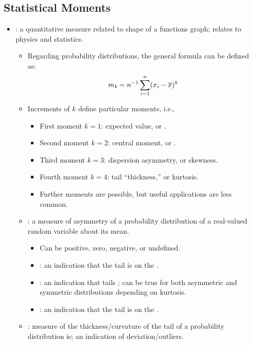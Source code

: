 \begin{itemize}
  \subsection{Statistical Moments}
  \begin{itemize}
    \item {}: a quantitative measure related to shape of a functions graph; relates to physics and statistics.
      \begin{itemize}
        \item Regarding probability distributions, the general formula can be defined as:
        \[%
        m_\emph{k} = n ^{-1} \sum_{i = 1}^{n}(x_i - \overline{x})^\emph{k}
        \]%
        \item Increments of \(k\) define particular moments, i.e.,
          \begin{itemize}
            \item First moment \(k=1\): expected value, or \hyperref[Subsection: Measures of Central Tendency]{}.
            \item Second moment \(k=2\): central moment, or \hyperref[Subsection: Measures of Dispersion]{}.
            \item Third moment \(k=3\): dispersion asymmetry, or skewness.
            \item Fourth moment \(k=4\): tail ``thickness,'' or kurtosis.
            \item Further moments are possible, but useful applications are less common.
          \end{itemize}
        \item {}: a measure of asymmetry of a probability distribution of a real-valued random variable about its mean.
          \begin{itemize}
            \item Can be positive, zero, negative, or undefined.
            \item {}: an indication that the tail is on the .
            \item {}: an indication that tails ; can be true for both asymmetric and symmetric distributions depending on kurtosis.
            \item {}: an indication that the tail is on the . 
          \end{itemize}
        \item {}: measure of the thickness/curvature of the tail of a probability distribution is; an indication of deviation/outliers.

\end{itemize}
\end{itemize}
\end{itemize}
